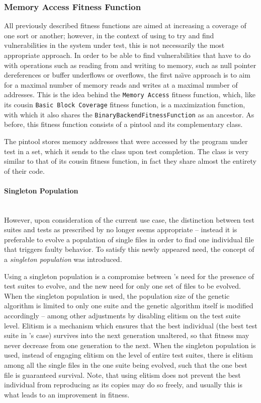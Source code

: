 \subsubsection{Memory Access Fitness Function}
\label{sec:memcov}
All previously described fitness functions are aimed at increasing a coverage of one sort or another; however,
in the context of using \xmlmate to try and find vulnerabilities in the system under test, this is not
necessarily the most appropriate approach. In order to be able to find vulnerabilities that have to do with
operations such as reading from and writing to memory, such as null pointer dereferences or buffer underflows
or overflows, the first na\"\i{}ve approach is to aim for a maximal number of memory reads and writes at a
maximal number of addresses. This is the idea behind the \texttt{Memory Access} fitness function, which, like
its cousin \texttt{Basic Block Coverage} fitness function, is a maximization function, with which it also shares
the \texttt{BinaryBackendFitnessFunction} as an ancestor. As before, this fitness function consists of a
pintool and its complementary \java class. 

The pintool stores memory addresses that were accessed by the program under test in a set, which it sends to
the \java class upon test completion.
The \java class is very similar to that of its cousin fitness function, in fact they share almost the entirety
of their code.

\paragraph{Singleton Population} ~\\
However, upon consideration of the current use case, the distinction between test suites and tests as
prescribed by \evosuite no longer seems appropriate -- instead it is preferable to evolve a population
of single \xml files in order to find one individual file that triggers faulty behavior. To satisfy this newly
appeared need, the concept of a \emph{singleton population} was introduced.

Using a singleton population is a compromise between \evosuite's need for the presence of test suites to
evolve, and the new need for only one set of files to be evolved. When the singleton population is used,
the population size of the genetic algorithm is limited to only one suite and the genetic algorithm itself is
modified accordingly -- among other adjustments by disabling elitism on the test suite level. Elitism is a
mechanism which ensures that the best individual (the best test suite in \evosuite's case) survives into the
next generation unaltered, so that fitness may never decrease from one generation to the next. 
When the singleton population is used, instead of engaging elitism on the level of entire test suites, there
is elitism among all the single files in the one suite being evolved, such that the one best file is
guaranteed survival. Note, that using elitism does not prevent the best individual from reproducing as its
copies may do so freely, and usually this is what leads to an improvement in fitness.
 
